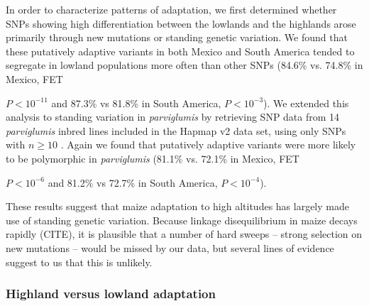 In order to characterize patterns of adaptation, we first determined whether  SNPs showing high differentiation between the lowlands and the highlands arose primarily through new mutations or standing genetic variation.  
We found that these putatively adaptive variants in both Mexico and South America tended to segregate in lowland populations more often than other SNPs (84.6\% vs. 74.8\% in Mexico, FET {$P < 10^{-11}$ and 87.3\% vs 81.8\% in South America,  $P< 10^{-3}$).  We extended this analysis to standing variation in \emph{parviglumis} by retrieving SNP data from 14 \emph{parviglumis} inbred lines included in the Hapmap v2 data set, using only SNPs with $n\geq10$ \cite[]{Hufford_2012_22660546}.  Again we found that putatively adaptive variants were more likely to be polymorphic in \emph{parviglumis} (81.1\% vs. 72.1\% in Mexico, FET {$P < 10^{-6}$ and 81.2\% vs 72.7\% in South America,  $P< 10^{-4}$).  

These results suggest that maize adaptation to high altitudes has largely made use of standing genetic variation. 
Because linkage disequilibrium in maize decays rapidly (CITE), it is plausible that a number of hard sweeps -- strong selection on new mutations -- would be missed by our data, but several lines of evidence suggest to us that this is unlikely.  

\subsubsection{Highland versus lowland adaptation}  

}}
